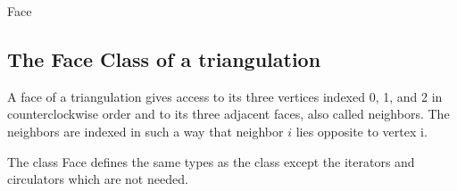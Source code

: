 \begin{ccClass} {Face}
\subsection{The Face  Class of a triangulation}
\label{I1_Sect_Triangulation_Face}
\def\ccTagRmEigenClassName{\ccFalse}

\ccDefinition
A face of a triangulation gives access to its three
vertices indexed 0, 1, and 2 in counterclockwise order
and to its three adjacent faces, also called neighbors.
The neighbors are indexed in such a way that neighbor $i$ lies
opposite to vertex i. 


\ccTypes
The class  {Face} defines the same types 
as the class  except the iterators and circulators
which are not needed.














\end{ccClass}
